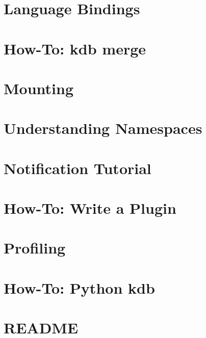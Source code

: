 \let\mypdfximage\pdfximage\def\pdfximage{\immediate\mypdfximage}\documentclass[twoside]{book}
\newcommand{\+}{\discretionary{\mbox{\scriptsize$\hookleftarrow$}}{}{}}
\begin{document}
\chapter{Language Bindings}
\label{doc_tutorials_language-bindings_md}

\chapter{How-\/\+To\+: kdb merge}
\label{doc_tutorials_merge_md}

\chapter{Mounting}
\label{doc_tutorials_mount_md}

\chapter{Understanding Namespaces}
\label{doc_tutorials_namespaces_md}

\chapter{Notification Tutorial}
\label{doc_tutorials_notifications_md}

\chapter{How-\/\+To\+: Write a Plugin}
\label{doc_tutorials_plugins_md}

\chapter{Profiling}
\label{doc_tutorials_profiling_md}

\chapter{How-\/\+To\+: Python kdb}
\label{doc_tutorials_python-kdb_md}

\chapter{R\+E\+A\+D\+ME}
\label{md_doc_tutorials_README}

\end{document}
